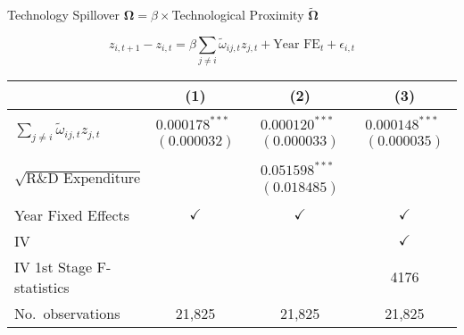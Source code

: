 \documentclass[
  10pt,               %
  aspectratio=169,     %
]{beamer}
\theoremstyle{plain}
\begin{document}
\begin{frame}{Technology Spillover $\bm{\Omega}=\beta\times$Technological Proximity $\bm{\widetilde{\Omega}}$}
  \vspace{-5mm}
  \label{regression}

  \[
    z_{i,t+1}-z_{i,t}
    =\beta\sum_{j\neq i}\tilde{\omega}_{ij,t}z_{j,t}
    +\text{Year FE}_{t}
    +\epsilon_{i,t}
  \]
  {\footnotesize
  \begin{center}
    \setlength{\tabcolsep}{6pt} %
    \begin{tabular}{lccc}
      \hline\hline
                                & (1)                                                                   & (2)          & (3)          \\
      \hline
      $\sum_{j\neq i}\tilde{\omega}_{ij,t}z_{j,t}$
                                & $\begin{array}{c}\text{0.000178}^{***}\\(\text{0.000032})\end{array}$
                                & $\begin{array}{c}\text{0.000120}^{***}\\(\text{0.000033})\end{array}$
                                & $\begin{array}{c}\text{0.000148}^{***}\\(\text{0.000035})\end{array}$                               \\

      $\sqrt{\text{R\&D Expenditure}}$
                                &
                                & $\begin{array}{c}\text{0.051598}^{***}\\(\text{0.018485})\end{array}$
                                &                                                                                                     \\
      \hline
      Year Fixed Effects        & $\checkmark$                                                          & $\checkmark$ & $\checkmark$ \\
      IV                        &                                                                       &              & $\checkmark$ \\
      IV 1st Stage F-statistics &                                                                       &              & 4176         \\
      No.\ observations         & 21,825                                                                & 21,825       & 21,825       \\
      \hline\hline
    \end{tabular}
  \end{center}

}
\end{frame}
\end{document}
